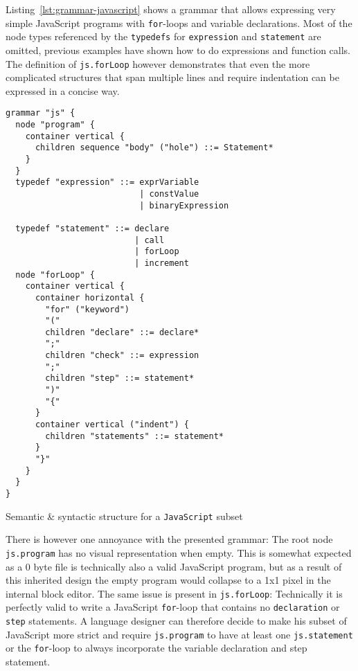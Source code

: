 \documentclass[sigconf,natbib=false]{acmart}
\newenvironment{longlisting}{\captionsetup{type=listing} \vspace{1.5em}}{\vspace{1.5em}}
\begin{document}
Listing~\ref{lst:grammar-javascript} shows a grammar that allows expressing very simple JavaScript programs with \texttt{for}-loops and variable declarations. Most of the node types referenced by the \texttt{typedefs} for \texttt{expression} and \texttt{statement} are omitted, previous examples have shown how to do expressions and function calls. The definition of \texttt{js.forLoop} however demonstrates that even the more complicated structures that span multiple lines and require indentation can be expressed in a concise way.

\begin{longlisting}
\begin{verbatim}
grammar "js" {
  node "program" {
    container vertical {
      children sequence "body" ("hole") ::= Statement*
    }
  }
  typedef "expression" ::= exprVariable
                           | constValue
                           | binaryExpression

  typedef "statement" ::= declare
                          | call
                          | forLoop
                          | increment
  node "forLoop" {
    container vertical {
      container horizontal {
        "for" ("keyword")
        "("
        children "declare" ::= declare*
        ";"
        children "check" ::= expression
        ";"
        children "step" ::= statement*
        ")"
        "{"
      }
      container vertical ("indent") {
        children "statements" ::= statement*
      }
      "}"
    }
  }
}
\end{verbatim}
\caption{Semantic \& syntactic structure for a \texttt{JavaScript} subset}
\label{lst:grammar-javascript}
\end{longlisting}

There is however one annoyance with the presented grammar: The root node \texttt{js.program} has no visual representation when empty. This is somewhat expected as a 0 byte file is technically also a valid JavaScript program, but as a result of this inherited design the empty program would collapse to a 1x1 pixel in the internal block editor. The same issue is present in \texttt{js.forLoop}: Technically it is perfectly valid to write a JavaScript \texttt{for}-loop that contains no \texttt{declaration} or \texttt{step} statements. A language designer can therefore decide to make his subset of JavaScript more strict and require \texttt{js.program} to have at least one \texttt{js.statement} or the \texttt{for}-loop to always incorporate the variable declaration and step statement.
\end{document}
